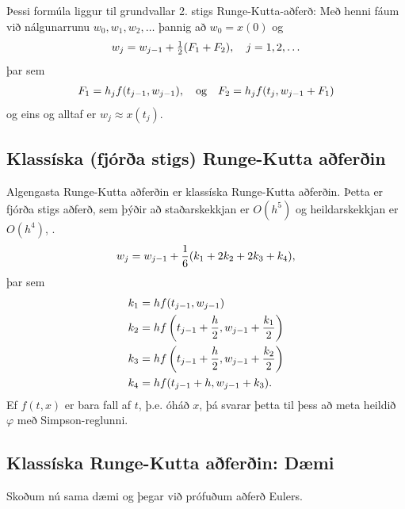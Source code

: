 \documentclass[letterpaper,10pt,icelandic]{sphinxmanual}
\begin{document}
Þessi formúla liggur til grundvallar 2. stigs Runge-Kutta-aðferð: Með
henni fáum við nálgunarrunu \(w_0, w_1, w_2, \ldots\) þannig að
\(w_0=x(0)\) og
\begin{gather}
\begin{split}w_j = w_{j-1} + \tfrac{1}{2}(F_1 + F_2), \quad j = 1,2,\ldots\end{split}\notag
\end{gather}
þar sem
\begin{gather}
\begin{split}F_1 = h_jf(t_{j-1},w_{j-1}),
  \quad \text{og} \quad
  F_2 = h_jf(t_j,w_{j-1}+F_1)\end{split}\notag
\end{gather}
og eins og alltaf er \(w_j \approx x(t_j)\).


\subsection{Klassíska (fjórða stigs) Runge-Kutta aðferðin}
\label{kafli06:klassiska-fjora-stigs-runge-kutta-aferin}\label{kafli06:index-12}
Algengasta Runge-Kutta aðferðin er klassíska Runge-Kutta aðferðin. Þetta
er fjórða stigs aðferð, sem þýðir að staðarskekkjan er \(O(h^5)\) og
heildarskekkjan er \(O(h^4)\), .
\begin{gather}
\begin{split}w_{j} = w_{j-1} + \frac 16(k_1 + 2k_2 + 2k_3 + k_4),\end{split}\notag
\end{gather}
þar sem
\begin{gather}
\begin{split}\begin{aligned}
  k_1 &= hf(t_{j-1},w_{j-1}) \\
  k_2 &= hf\left(t_{j-1} + \frac h2,w_{j-1}+ \frac{k_1}2\right) \\
  k_3 &= hf\left(t_{j-1} + \frac h2,w_{j-1}+ \frac{k_2}2\right) \\
  k_4 &= hf(t_{j-1} + h,w_{j-1}+ k_3).
 \end{aligned}\end{split}\notag
\end{gather}
Ef \(f(t,x)\) er bara fall af \(t\), þ.e. óháð \(x\), þá
svarar þetta til þess að meta heildið \({\varphi}\) með
Simpson-reglunni.


\subsection{Klassíska Runge-Kutta aðferðin: Dæmi}
\label{kafli06:klassiska-runge-kutta-aferin-daemi}
Skoðum nú sama dæmi og þegar við prófuðum aðferð Eulers.
\end{document}
